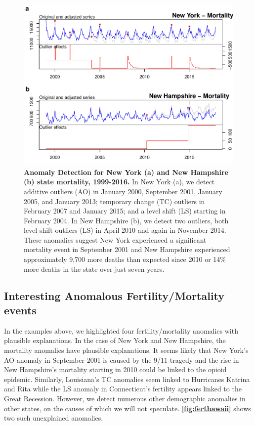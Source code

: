 \documentclass[12pt]{article}
\begin{document}
\begin{figure}
\centering
\includegraphics{MainDocument_files/figure-latex/MortalityAnomalies-1.pdf}
\caption{\textbf{Anomaly Detection for New York (a) and New Hampshire (b) state mortality, 1999-2016.}
In New York (a), we detect additive outliers (AO) in January 2000,
September 2001, January 2005, and January 2013; temporary change (TC)
outliers in February 2007 and January 2015; and a level shift (LS)
starting in February 2004. In New Hampshire (b), we detect two outliers,
both level shift outliers (LS) in April 2010 and again in November 2014.
These anomalies suggest New York experienced a significant mortality
event in September 2001 and New Hampshire experienced approximately
9,700 more deaths than expected since 2010 or 14\% more deaths in the
state over just seven years. \label{fig:mortnewhamp}}
\end{figure}

\hypertarget{interesting-anomalous-fertilitymortality-events}{%
\subsection{Interesting Anomalous Fertility/Mortality
events}\label{interesting-anomalous-fertilitymortality-events}}

In the examples above, we highlighted four fertility/mortality anomalies
with plausible explanations. In the case of New York and New Hampshire,
the mortality anomalies have plausible explanations. It seems likely
that New York's AO anomaly in September 2001 is caused by the 9/11
tragedy and the rise in New Hampshire's mortality starting in 2010 could
be linked to the opioid epidemic. Similarly, Louisiana's TC anomalies
seem linked to Hurricanes Katrina and Rita while the LS anomaly in
Connecticut's fertility appears linked to the Great Recession. However,
we detect numerous other demographic anomalies in other states, on the
causes of which we will not speculate. \textbf{\autoref{fig:ferthawaii}}
shows two such unexplained anomalies.
\end{document}
